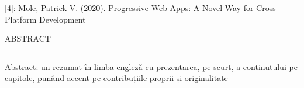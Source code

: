 \documentclass[12pt]{report}
\begin{document}
[4]: Mole, Patrick V. (2020). Progressive Web Apps: A Novel Way for Cross-Platform Development

\newpage
\thispagestyle{empty}
\mbox{}
\newpage
{} 

\cleardoublepage
ABSTRACT
\vspace{0.5cm}	
\hrule
\vspace{0.5cm}	

Abstract: un rezumat în limba engleză cu prezentarea, pe scurt, a conținutului pe capitole, punând accent pe contribuțiile proprii și originalitate



\tableofcontents


\newpage
{}










\end{document}
